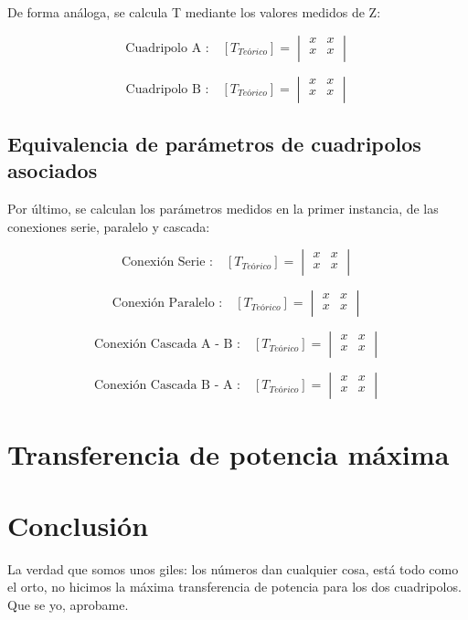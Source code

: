 \documentclass[a4paper]{article}
\begin{document}
De forma análoga, se calcula T mediante los valores medidos de Z: 

\begin{equation}
\text{Cuadripolo A :}\quad [T_{Teórico}] =
\begin{vmatrix}
	x & x\\
	x & x\\
\end{vmatrix}
\end{equation}

\begin{equation}
\text{Cuadripolo B :}\quad [T_{Teórico}] =
\begin{vmatrix}
	x & x\\
	x & x\\
\end{vmatrix}
\end{equation}

\subsection*{Equivalencia de parámetros de cuadripolos asociados}

Por último, se calculan los parámetros medidos en la primer instancia, de las conexiones serie, paralelo y cascada:

\begin{equation}
\text{Conexión Serie :}\quad [T_{Teórico}] =
\begin{vmatrix}
	x & x\\
	x & x\\
\end{vmatrix}
\end{equation}

\begin{equation}
\text{Conexión Paralelo :}\quad [T_{Teórico}] =
\begin{vmatrix}
	x & x\\
	x & x\\
\end{vmatrix}
\end{equation}

\begin{equation}
\text{Conexión Cascada A - B :}\quad [T_{Teórico}] =
\begin{vmatrix}
	x & x\\
	x & x\\
\end{vmatrix}
\end{equation}

\begin{equation}
\text{Conexión Cascada B - A :}\quad [T_{Teórico}] =
\begin{vmatrix}
	x & x\\
	x & x\\
\end{vmatrix}
\end{equation}

\section*{Transferencia de potencia máxima}

\section*{Conclusión}

La verdad que somos unos giles: los números dan cualquier cosa, está todo como el orto, no hicimos la máxima transferencia de potencia para los dos cuadripolos. Que se yo, aprobame.
\end{document}
